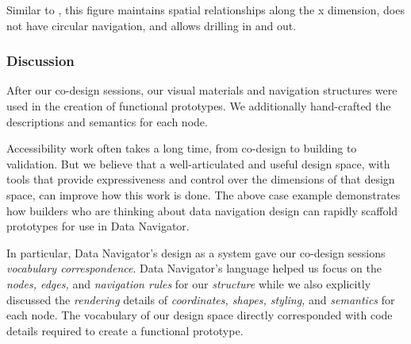 \documentclass[12pt]{cmuthesis}
\begin{document}
Similar to , this figure maintains spatial relationships along the x dimension, does not have circular navigation, and allows drilling in and out.


\subsubsection{Discussion}
After our co-design sessions, our visual materials and navigation structures were used in the creation of functional prototypes. We additionally hand-crafted the descriptions and semantics for each node.

Accessibility work often takes a long time, from co-design to building to validation. But we believe that a well-articulated and useful design space, with tools that provide expressiveness and control over the dimensions of that design space, can improve how this work is done. The above case example demonstrates how builders who are thinking about data navigation design can rapidly scaffold prototypes for use in Data Navigator.

In particular, Data Navigator's design as a system gave our co-design sessions \textit{vocabulary correspondence}. Data Navigator's language helped us focus on the \textit{nodes, edges,} and \textit{navigation rules} for our \textit{structure} while we also explicitly discussed the \textit{rendering} details of \textit{coordinates, shapes, styling,} and \textit{semantics} for each node. The vocabulary of our design space directly corresponded with code details required to create a functional prototype.
\end{document}
